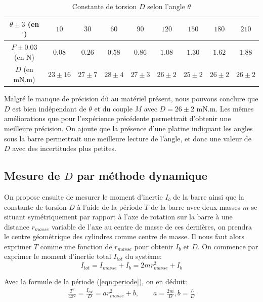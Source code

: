 \documentclass[12pt]{article}
\begin{document}
\break

\begin{table}[h!]
	\centering
	\begin{tabular}{||c | c c c c c c c c||} 
		\hline
		$\theta \pm 3$ (en $^\circ$) & $10$ & $30$ & $60$ & $90$ & $120$ & $150$ & $180$ & $210$ \\
		\hline
        $F \pm 0.03$ (en N) & $0.08$ & $0.26$ & $0.58$ & $0.86$ & $1.08$ & $1.30$ & $1.62$ & $1.88$\\
		\hline
        $D$ (en mN.m) & $23 \pm 16$ & $27 \pm 7$ & $28 \pm 4$ & $27 \pm 3$ & $26 \pm 2$ & $25 \pm 2$ & $26 \pm 2$ & $26 \pm 2$\\
        \hline
    \end{tabular}
	\caption{Constante de torsion $D$ selon l'angle $\theta$}
	\label{table:mesure_D_statique}
\end{table}

Malgré le manque de précision dû au matériel présent, nous pouvons conclure que $D$ est bien indépendant de $\theta$ et du couple $M$ avec $D=26 \pm 2 \text{ mN.m}$. 
Les mêmes améliorations que pour l'expérience précédente permettrait d'obtenir une meilleure précision. 
On ajoute que la présence d'une platine indiquant les angles sous la barre permettrait une meilleure
lecture de l'angle, et donc une valeur de $D$ avec des incertitudes plus petites.


\subsection{Mesure de $D$ par méthode dynamique}
On propose ensuite de mesurer le moment d'inertie $I_b$ de la barre ainsi que la constante de torsion $D$ à l'aide de la période $T$
de la barre avec deux masses $m$ se situant symétriquement par rapport à l'axe de rotation sur la barre à une distance $r_{masse}$ variable de l'axe au centre de masse de ces dernières, on prendra le centre géométrique des cylindres
comme centre de masse. Il nous faut alors exprimer $T$ comme une fonction de $r_{masse}$ pour obtenir 
$I_b$ et $D$. On commence par exprimer le moment d'inertie total $I_{tot}$ du système:
\begin{equation}
    I_{tot} = I_{masse} + I_b = 2mr_{masse}^2 + I_b
\end{equation}

Avec la formule de la période (\ref{eqn:periode}), on en déduit:
\begin{align*}
    \frac{T^2}{4\pi^2} = \frac{I_{tot}}{D} = ar_{masse}^2 + b, \quad \quad a = \frac{2m}{D}, b=\frac{I_b}{D}
\end{align*}
\end{document}
